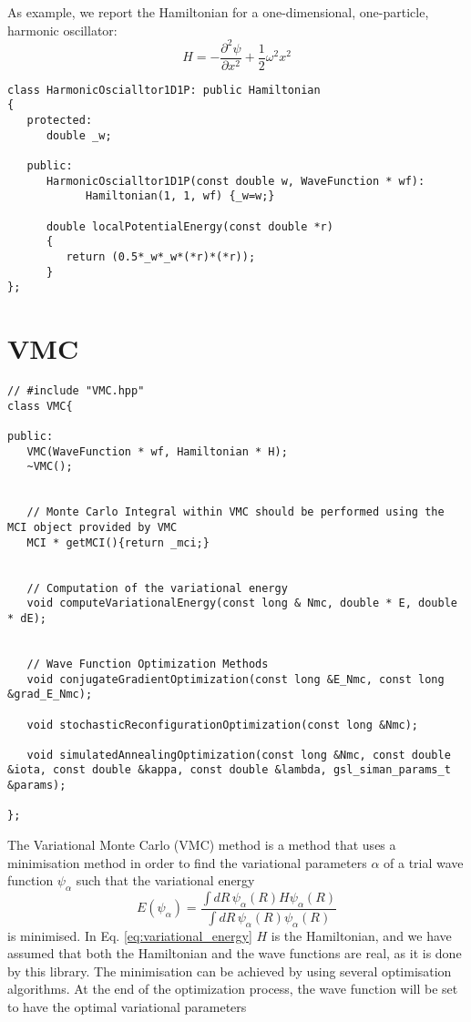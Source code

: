 \documentclass[11pt,a4paper,twoside]{article}
\begin{document}
As example, we report the Hamiltonian for a one-dimensional, one-particle, harmonic oscillator:
\begin{equation}
   H = - \frac{\partial^2 \psi}{\partial x^2} + \frac{1}{2} \omega^2 x^2
\end{equation}

\begin{lstlisting}
class HarmonicOscialltor1D1P: public Hamiltonian
{
   protected:
      double _w;
      
   public:
      HarmonicOscialltor1D1P(const double w, WaveFunction * wf): 
            Hamiltonian(1, 1, wf) {_w=w;}
            
      double localPotentialEnergy(const double *r)
      {
         return (0.5*_w*_w*(*r)*(*r));
      }
};
\end{lstlisting}




\section{VMC} %
\label{sec:vmc}

\begin{lstlisting}
// #include "VMC.hpp"
class VMC{        

public:
   VMC(WaveFunction * wf, Hamiltonian * H);
   ~VMC();
   
   
   // Monte Carlo Integral within VMC should be performed using the MCI object provided by VMC
   MCI * getMCI(){return _mci;}
   
   
   // Computation of the variational energy
   void computeVariationalEnergy(const long & Nmc, double * E, double * dE);
   

   // Wave Function Optimization Methods
   void conjugateGradientOptimization(const long &E_Nmc, const long &grad_E_Nmc);
   
   void stochasticReconfigurationOptimization(const long &Nmc);
   
   void simulatedAnnealingOptimization(const long &Nmc, const double &iota, const double &kappa, const double &lambda, gsl_siman_params_t &params);

};
\end{lstlisting}

The Variational Monte Carlo (VMC) method is a method that uses a minimisation method in order to find the variational parameters $\alpha$ of a trial wave function $\psi_{\alpha}$ such that the variational energy
\begin{equation}
   E(\psi_{\alpha}) = \frac{\int dR \, \psi_{\alpha}(R) H \psi_{\alpha}(R)}{\int dR \, \psi_{\alpha}(R) \psi_{\alpha}(R)}  \label{eq:variational_energy}
\end{equation}
is minimised.
In Eq. \eqref{eq:variational_energy} $H$ is the Hamiltonian, and we have assumed that both the Hamiltonian and the wave functions are real, as it is done by this library.
The minimisation can be achieved by using several optimisation algorithms. At the end of the optimization process, the wave function will be set to have the optimal variational parameters
\end{document}
